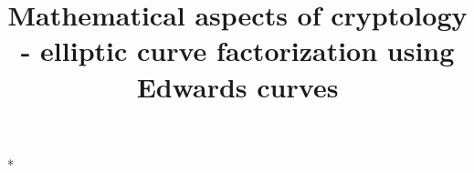 \documentclass[a4paper,11pt,twoside]{memoir}
\title{Mathematical aspects of cryptology - elliptic curve factorization using Edwards curves}
\begin{document}

\frontmatter

\begin{titlingpage}

\end{titlingpage}



\begin{tableofcontents}*
\end{tableofcontents}


\mainmatter
\pagestyle{ruled}





\appendix


\backmatter

\nocite{peters11}
\nocite{Bernstein_ecmon}
\nocite{Montgomery:1987}
\nocite{journals/iacr/BernsteinBL10}
\nocite{cryptoeprint:2008:013}
\nocite{Hisil:2008:TEC:1485924.1485951}
\nocite{cryptoeprint:2008:218}


\end{document}
